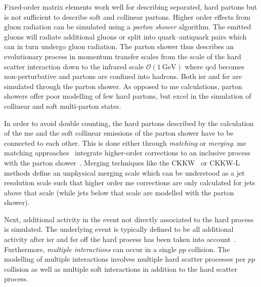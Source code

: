 Fixed-order matrix elements work well for describing separated, hard partons but is not sufficient to describe soft and collinear partons. Higher order effects from gluon radiation can be simulated using a \textit{parton shower} algorithm. The emitted gluons will radiate additional gluons or split into quark--antiquark pairs which can in turn undergo gluon radiation. The parton shower thus describes an evolutionary process in momentum transfer scales from the scale of the hard scatter interaction down to the infrared scale $\mathcal{O}(\SI{1}{\GeV})$ where \gls{qcd} becomes non-perturbative and partons are confined into hadrons. Both \gls{isr} and \gls{fsr} are simulated through the parton shower. As opposed to \gls{me} calculations, parton showers offer poor modelling of few hard partons, but excel in the simulation of collinear and soft multi-parton states.

In order to avoid double counting, the hard partons described by the calculation of the \gls{me} and the soft collinear emissions of the parton shower have to be connected to each other. This is done either through \textit{matching} or \textit{merging}. \gls{me} matching approaches~\cite{Bengtsson:1986hr} integrate higher-order corrections to an inclusive process with the parton shower~\cite{Buckley:2011ms}. Merging techniques like the CKKW~\cite{Catani:2001cc} or CKKW-L~\cite{Lonnblad:2001iq} methods define an unphysical merging scale which can be understood as a jet resolution scale such that higher order \gls{me} corrections are only calculated for jets above that scale (while jets below that scale are modelled with the parton shower).

Next, additional activity in the event not directly associated to the hard process is simulated. The underlying event is typically defined to be all additional activity after \gls{isr} and \gls{fsr} off the hard process has been taken into account~\cite{Buckley:2011ms}. Furthermore, \textit{multiple interactions} can occur in a single $pp$ collision. The modelling of multiple interactions involves multiple hard scatter processes per $pp$ collision as well as multiple soft interactions in addition to the hard scatter process.

